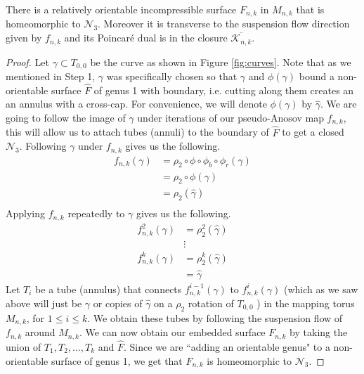 \begin{lem}
\label{lem:genus3}
There is a relatively orientable incompressible surface $F_{n,k}$ in $M_{n,k}$ that is homeomorphic to $\mathcal{N}_3$.
Moreover it is transverse to the suspension flow direction given by $f_{n,k}$ and its Poincar\'e dual is in
the closure $\overline{\mathcal{K}_{n,k}}$.
\end{lem}
\begin{proof}
  Let $\gamma \subset T_{0,0}$ be the curve as shown in Figure \ref{fig:curves}. Note that as we mentioned in Step 1,
  $\gamma$ was specifically chosen so that $\gamma$ and $\phi(\gamma)$ bound a non-orientable surface
  $\hat{F}$ of genus 1 with boundary, i.e. cutting along them creates an an annulus with a cross-cap. For
  convenience, we will denote $\phi(\gamma)$ by $\hat{\gamma}$. We are going to follow the image of $\gamma$
  under iterations of our pseudo-Anosov map $f_{n,k}$, this will allow us to attach tubes (annuli) to the
  boundary of $\hat{F}$ to get a closed $\mathcal{N}_3$. Following $\gamma$ under $f_{n,k}$ gives us the
  following.
  \begin{align*}
    f_{n,k}(\gamma) &= \rho_2 \circ \phi \circ \phi_b \circ \phi_r(\gamma) \\
                    &= \rho_2 \circ \phi(\gamma) \\
                    &= \rho_2(\hat{\gamma}) \\
  \end{align*}
  Applying $f_{n,k}$ repeatedly to ${\gamma}$ gives us the following.
  \begin{align*}
    f^2_{n,k}(\gamma) &= \rho_2^2(\hat{\gamma}) \\
                      &\vdots \\
    f^k_{n,k}(\gamma) &= \rho_2^k(\hat{\gamma})\\
                      &= \hat{\gamma}
  \end{align*}
  Let $T_i$ be a tube (annulus) that connects $f_{n,k}^{i-1}(\gamma)$ to $f_{n,k}^i(\gamma)$
  (which as we saw above will just be $\gamma$ or copies of $\hat{\gamma}$ on a $\rho_2$ rotation of $T_{0,0}$
  ) in the mapping torus $M_{n,k}$, for $1 \leq i \leq k$. We obtain these tubes by following the suspension
  flow of $f_{n,k}$ around $M_{n,k}$. We can now obtain our embedded surface $F_{n,k}$ by taking the union of
  $T_1,T_2,\dots,T_k$ and $\hat{F}$. Since we are ``adding an orientable genus" to a non-orientable surface of
  genus 1, we get that $F_{n,k}$ is homeomorphic to $\mathcal{N}_3$.


\end{proof}
